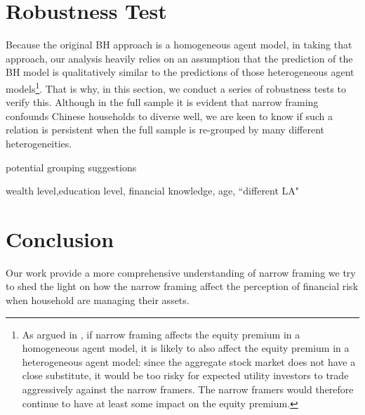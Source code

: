 \documentclass[ukenglish,nottitlepage,thmsb,11pt,letterpaper]{article}
\begin{document}
\section{Robustness Test}

Because the original BH approach is a homogeneous agent model, in taking that approach, our analysis heavily relies on an assumption that the prediction of the BH model is qualitatively similar to the predictions of those heterogeneous agent models\footnote{As argued in \cite{Barberis2009}, if narrow framing affects the equity premium in a homogeneous agent model, it is likely to also affect the equity premium in a heterogeneous agent model: since the aggregate stock market does not have a close substitute, it would be too risky for expected utility investors to trade aggressively against the narrow framers. The narrow framers would therefore continue to have at least some impact on the equity premium.}. That is why, in this section, we conduct a series of robustness tests to verify this.  Although in the full sample it is evident that narrow framing confounds Chinese households to diverse well, we are keen to know if such a relation is persistent when the full sample is re-grouped by many different heterogeneities.

potential grouping suggestions

wealth level,education level, financial knowledge, age, ``different LA"

\section{Conclusion}
Our work provide a more comprehensive understanding of narrow framing
we try to shed the light on how the narrow framing affect the perception of financial risk when household are managing their assets.

\newpage
\setlength{\bibsep}{0pt plus 1.5ex}


\end{document}
